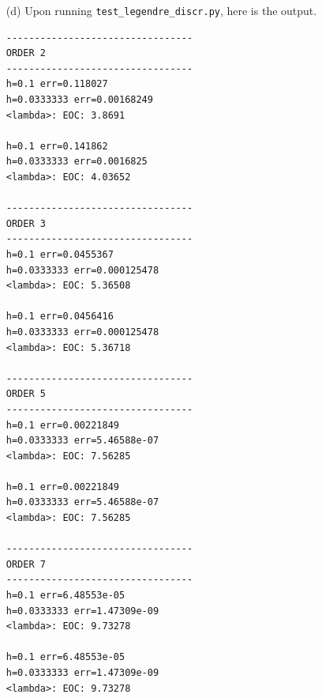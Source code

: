 \documentclass[10pt]{article}
\begin{document}
\begin{itemize}
\newpage

\item[(d)] Upon running \verb+test_legendre_discr.py+, here is the output.

\begin{verbatim}
---------------------------------
ORDER 2
---------------------------------
h=0.1 err=0.118027
h=0.0333333 err=0.00168249
<lambda>: EOC: 3.8691

h=0.1 err=0.141862
h=0.0333333 err=0.0016825
<lambda>: EOC: 4.03652

---------------------------------
ORDER 3
---------------------------------
h=0.1 err=0.0455367
h=0.0333333 err=0.000125478
<lambda>: EOC: 5.36508

h=0.1 err=0.0456416
h=0.0333333 err=0.000125478
<lambda>: EOC: 5.36718

---------------------------------
ORDER 5
---------------------------------
h=0.1 err=0.00221849
h=0.0333333 err=5.46588e-07
<lambda>: EOC: 7.56285

h=0.1 err=0.00221849
h=0.0333333 err=5.46588e-07
<lambda>: EOC: 7.56285

---------------------------------
ORDER 7
---------------------------------
h=0.1 err=6.48553e-05
h=0.0333333 err=1.47309e-09
<lambda>: EOC: 9.73278

h=0.1 err=6.48553e-05
h=0.0333333 err=1.47309e-09
<lambda>: EOC: 9.73278
\end{verbatim}

\end{itemize}

\newpage

\end{document}
